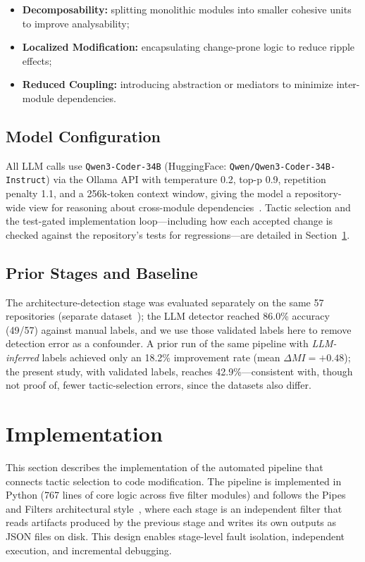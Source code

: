 \documentclass[runningheads]{llncs}
\begin{document}
\begin{itemize}[nosep]
    \item \textbf{Decomposability:} splitting monolithic modules into smaller cohesive units to improve analysability;
    \item \textbf{Localized Modification:} encapsulating change-prone logic to reduce ripple effects;
    \item \textbf{Reduced Coupling:} introducing abstraction or mediators to minimize inter-module dependencies.
\end{itemize}

\subsection{Model Configuration}

All LLM calls use \texttt{Qwen3-Coder-34B} (HuggingFace: \texttt{Qwen/Qwen3-Coder-34B-Instruct}) via the Ollama API with temperature 0.2, top-p 0.9, repetition penalty 1.1, and a 256k-token context window, giving the model a repository-wide view for reasoning about cross-module dependencies~\cite{piao2025refactoring}. Tactic selection and the test-gated implementation loop---including how each accepted change is checked against the repository's tests for regressions---are detailed in Section~\ref{sec:implementation}.

\subsection{Prior Stages and Baseline}
\label{sec:eval_arch_detection}

The architecture-detection stage was evaluated separately on the same 57 repositories (separate dataset~\cite{anon_archdetect_2026}); the LLM detector reached 86.0\% accuracy (49/57) against manual labels, and we use those validated labels here to remove detection error as a confounder. A prior run of the same pipeline with \emph{LLM-inferred} labels achieved only an 18.2\% improvement rate (mean $\Delta MI = +0.48$); the present study, with validated labels, reaches 42.9\%---consistent with, though not proof of, fewer tactic-selection errors, since the datasets also differ.

\FloatBarrier
\section{Implementation}
\label{sec:implementation}

This section describes the implementation of the automated pipeline that connects tactic selection to code modification. The pipeline is implemented in Python (767 lines of core logic across five filter modules) and follows the Pipes and Filters architectural style~\cite{bass2021software}, where each stage is an independent filter that reads artifacts produced by the previous stage and writes its own outputs as JSON files on disk. This design enables stage-level fault isolation, independent execution, and incremental debugging.
\end{document}
